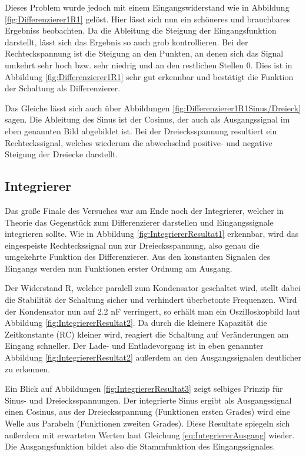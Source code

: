 \documentclass[12pt,a4paper,twoside]{article}
\begin{document}
\noindent
Dieses Problem wurde jedoch mit einem Eingangswiderstand wie in Abbildung \ref{fig:Differenzierer1R1} gelöst.
Hier lässt sich nun ein schöneres und brauchbares Ergebniss beobachten. Da die Ableitung die Steigung der Eingangsfunktion darstellt, lässt sich das Ergebnis so auch grob kontrollieren. 
Bei der Rechteckspannung ist die Steigung an den Punkten, an denen sich das Signal umkehrt sehr hoch bzw. sehr niedrig und an den restlichen Stellen 0. Dies ist in Abbildung \ref{fig:Differenzierer1R1} sehr gut erkennbar und bestätigt die Funktion der Schaltung als Differenzierer. \newline

\noindent
Das Gleiche lässt sich auch über Abbildungen \ref{fig:Differenzierer1R1Sinus/Dreieck} sagen. Die Ableitung des Sinus ist der Cosinus, der auch als Ausgangssignal im eben genannten Bild abgebildet ist.
Bei der Dreiecksspannung resultiert ein Rechteckssignal, welches wiederum die abwechselnd positive- und negative Steigung der Dreiecke darstellt. 



\subsection{Integrierer}

Das große Finale des Versuches war am Ende noch der Integrierer, welcher in Theorie das Gegenstück zum Differenzierer darstellen und Eingangssignale integrieren sollte. 
Wie in Abbildung \ref{fig:IntegriererResultat1} erkennbar, wird das eingespeiste Rechteckssignal nun zur Dreiecksspannung, also genau die umgekehrte Funktion des Differenzierer. Aus den konstanten Signalen des Eingangs werden nun Funktionen erster Ordnung am Ausgang. \newline

\noindent
Der Widerstand R, welcher paralell zum Kondensator geschaltet wird, stellt dabei die Stabilität der Schaltung sicher und verhindert überbetonte Frequenzen. Wird der Kondensator nun auf 2.2 nF verringert, so erhält man ein Oszilloskopbild laut Abbildung \ref{fig:IntegriererResultat2}.
Da durch die kleinere Kapazität die Zeitkonstante (RC) kleiner wird, reagiert die Schaltung auf Veränderungen am Eingang schneller. Der Lade- und Entladevorgang ist in eben genannter Abbildung \ref{fig:IntegriererResultat2} außerdem an den Ausgangssignalen deutlicher zu erkennen. \newline

\noindent
Ein Blick auf Abbildungen \ref{fig:IntegriererResultat3} zeigt selbiges Prinzip für Sinus- und Dreiecksspannungen. Der integrierte Sinus ergibt als Ausgangssignal einen Cosinus, aus der Dreiecksspannung (Funktionen ersten Grades) wird eine Welle aus Parabeln (Funktionen zweiten Grades).
Diese Resultate spiegeln sich außerdem mit erwarteten Werten laut Gleichung \ref{eq:IntegriererAusgang} wieder. Die Ausgangsfunktion bildet also die Stammfunktion des Eingangssignales.
\end{document}
